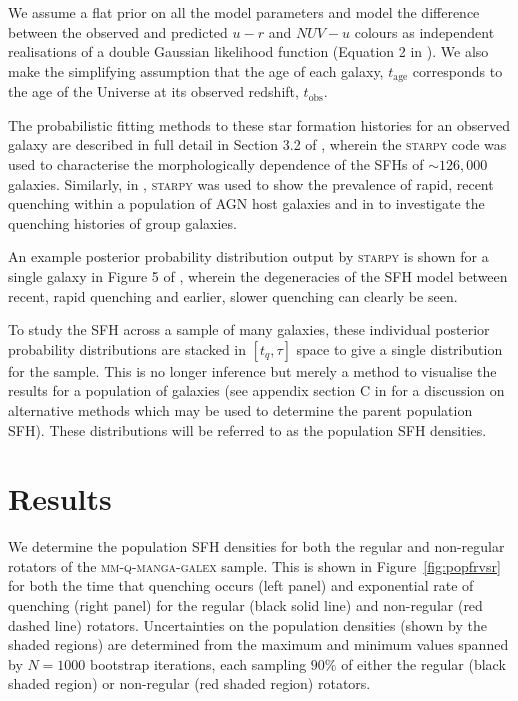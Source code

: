 \documentclass[useAMS,usenatbib]{mn2e}
\begin{document}
We assume a flat prior on all the model parameters and model the difference between the observed and predicted $u-r$ and $NUV-u$ colours as independent realisations of a double Gaussian likelihood function (Equation 2 in \citealt{smethurst15}). We also make the simplifying assumption that the age of each galaxy, $t_\mathrm{age}$ corresponds to the age of the Universe at its observed redshift, $t_\mathrm{obs}$.

The probabilistic fitting methods to these star formation histories for an observed galaxy are described in full detail in Section 3.2 of \cite{smethurst15}, wherein the \textsc{starpy} code was used to characterise the morphologically dependence of the SFHs of $\sim126,000$ galaxies. Similarly, in \cite{smethurst16}, \textsc{starpy} was used to show the prevalence of rapid, recent quenching within a population of AGN host galaxies and in \cite{smethurst17} to investigate the quenching histories of group galaxies. 


An example posterior probability distribution output by \textsc{starpy} is shown for a single galaxy in Figure 5 of \cite{smethurst15}, wherein the degeneracies of the SFH model between recent, rapid quenching and earlier, slower quenching can clearly be seen. 

To study the SFH across a sample of many galaxies, these individual posterior probability distributions are stacked in $[t_q, \tau]$ space to give a single distribution for the sample. This is no longer inference but merely a method to visualise the results for a population of galaxies (see appendix section C in \citealt{smethurst16} for a discussion on alternative methods which may be used to determine the parent population SFH). These distributions will be referred to as the population SFH densities.

\section{Results}\label{sec:results}

We determine the population SFH densities for both the regular and non-regular rotators of the \textsc{mm-q-manga-galex} sample. This is shown in Figure~\ref{fig:popfrvsr} for both the time that quenching occurs (left panel) and exponential rate of quenching (right panel) for the regular (black solid line) and non-regular (red dashed line) rotators. Uncertainties on the population densities (shown by the shaded regions) are determined from the maximum and minimum values spanned by $N = 1000$ bootstrap iterations, each sampling $90\%$ of either the regular (black shaded region) or non-regular (red shaded region) rotators. 
\end{document}
